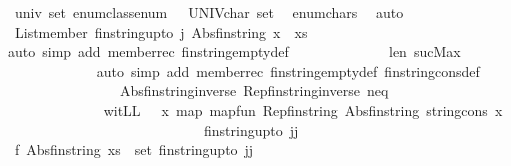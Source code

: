 \begin{isabellebody}
\ univ{\isacharcolon}{\isachardoublequoteopen}\ set\ enum{\isacharunderscore}class{\isachardot}enum\ \ {\isacharequal}\ {\isacharparenleft}UNIV{\isacharcolon}{\isacharcolon}char\ set{\isacharparenright}{\isachardoublequoteclose}\ \isamarkupfalse%
\ enum{\isacharunderscore}chars\ \isamarkupfalse%
\ auto\isanewline
\ \ \ \ \ \ \ \ \ \ \isamarkupfalse%
\ {\isachardoublequoteopen}List{\isachardot}member\ {\isacharparenleft}fin{\isacharunderscore}string{\isacharunderscore}upto\ j{\isacharparenright}\ {\isacharparenleft}Abs{\isacharunderscore}fin{\isacharunderscore}string\ {\isacharparenleft}x\ {\isacharhash}\ xs{\isacharparenright}{\isacharparenright}{\isachardoublequoteclose}\isanewline
\ \ \ \ \ \ \ \ \ \ \ \ \isamarkupfalse%
{\isacharparenleft}auto\ simp\ add{\isacharcolon}\ member{\isacharunderscore}rec{\isacharparenleft}{}{\isacharparenright}\ fin{\isacharunderscore}string{\isacharunderscore}empty{\isacharunderscore}def{\isacharparenright}\isanewline
\ \ \ \ \ \ \ \ \ \ \ \ \isamarkupfalse%
\ len\ sucMax\ \isanewline
\ \ \ \ \ \ \ \ \ \ \ \ \isamarkupfalse%
{\isacharparenleft}auto\ simp\ add{\isacharcolon}\ member{\isacharunderscore}rec\ fin{\isacharunderscore}string{\isacharunderscore}empty{\isacharunderscore}def\ fin{\isacharunderscore}string{\isacharunderscore}cons{\isacharunderscore}def\isanewline
\ \ \ \ \ \ \ \ \ \ \ \ \ \ \ \ Abs{\isacharunderscore}fin{\isacharunderscore}string{\isacharunderscore}inverse\ Rep{\isacharunderscore}fin{\isacharunderscore}string{\isacharunderscore}inverse\ neq{\isacharparenright}\isanewline
\ \ \ \ \ \ \ \ \ \ \isamarkupfalse%
\ {\isacharminus}\isanewline
\ \ \ \ \ \ \ \ \ \ \ \ \isamarkupfalse%
\ {\isacharquery}witLL\ {\isacharequal}\ {\isachardoublequoteopen}{\isacharparenleft}{\isasymlambda}\ x{\isachardot}\ map\ {\isacharparenleft}map{\isacharunderscore}fun\ Rep{\isacharunderscore}fin{\isacharunderscore}string\ Abs{\isacharunderscore}fin{\isacharunderscore}string\ {\isacharparenleft}string{\isacharunderscore}cons\ x{\isacharparenright}{\isacharparenright}\ \isanewline
\ \ \ \ \ \ \ \ \ \ \ \ \ \ \ \ \ \ \ \ \ \ \ \ \ \ \ \ {\isacharparenleft}fin{\isacharunderscore}string{\isacharunderscore}upto\ jj{\isacharparenright}{\isacharparenright}{\isachardoublequoteclose}\isanewline
\ \ \ \ \ \ \ \ \ \ \ \ \isamarkupfalse%
\ f{}{\isacharcolon}\ {\isachardoublequoteopen}Abs{\isacharunderscore}fin{\isacharunderscore}string\ xs\ {\isasymin}\ set\ {\isacharparenleft}fin{\isacharunderscore}string{\isacharunderscore}upto\ jj{\isacharparenright}{\isachardoublequoteclose}\isanewline

\end{isabellebody}
